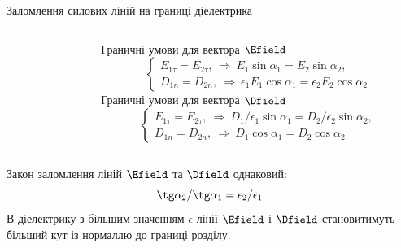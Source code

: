 \documentclass[onlytextwidth]{beamer}
\begin{document}
\begin{frame}{Заломлення силових ліній на границі діелектрика}{}
\begin{columns}
\begin{column}{0.55\linewidth}
		\end{column}
		\begin{column}{0.45\linewidth}
			Граничні умови для вектора $\Efield$
			\begin{equation*}
				\begin{cases}
					E_{1\tau} = E_{2\tau},\ \Rightarrow\ E_1\sin\alpha_1 = E_2\sin\alpha_2, \\
					D_{1n} = D_{2n},\ \Rightarrow\ \epsilon_1E_1\cos\alpha_1 =
					\epsilon_2E_2\cos\alpha_2
				\end{cases}
			\end{equation*}
			Граничні умови для вектора $\Dfield$
			\begin{equation*}
				\begin{cases}
					E_{1\tau} = E_{2\tau},\ \Rightarrow\ D_1/\epsilon_1\sin\alpha_1 =
					D_2/\epsilon_2\sin\alpha_2, \\
					D_{1n} = D_{2n},\ \Rightarrow\ D_1\cos\alpha_1 =
					D_2\cos\alpha_2
				\end{cases}
			\end{equation*}
		\end{column}
	\end{columns}
	\begin{block}{}\justifying
		Закон заломлення ліній $\Efield$ та $\Dfield$ однаковий:
		\begin{equation*}
			\tg\alpha_2 / \tg\alpha_1 = \epsilon_2 / \epsilon_1.
		\end{equation*}
		В діелектрику з більшим значенням $\epsilon$ лінії $\Efield$ і $\Dfield$
		становитимуть більший кут із нормаллю до границі розділу.
	\end{block}
\end{frame}


%
\end{document}
